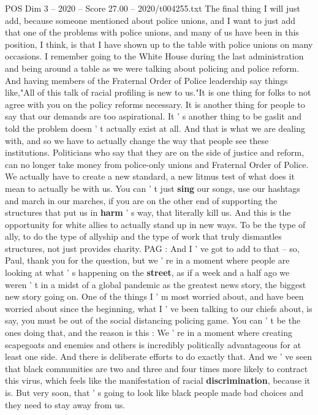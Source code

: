 \begin{textsample}{POS Dim 3 – 2020 – Score 27.00 – 2020/t004255.txt}
The final thing I will just add, because someone mentioned about police unions, and I want to just add that one of the problems with police unions, and many of us have been in this position, I think, is that I have shown up to the table with police unions on many occasions.
I remember going to the White House during the last administration and being around a table as we were talking about policing and police reform.
And having members of the Fraternal Order of Police leadership say things like,"All of this talk of racial profiling is new to us."It is one thing for folks to not agree with you on the policy reforms necessary.
It is another thing for people to say that our demands are too aspirational.
It ' s another thing to be gaslit and told the problem doesn ' t actually exist at all.
And that is what we are dealing with, and so we have to actually change the way that people see these institutions.
Politicians who say that they are on the side of justice and reform, can no longer take money from police-only unions and Fraternal Order of Police.
We actually have to create a new standard, a new litmus test of what does it mean to actually be with us.
You can ' t just \textbf{sing} our songs, use our hashtags and march in our marches, if you are on the other end of supporting the structures that put us in \textbf{harm} ' s way, that literally kill us.
And this is the opportunity for white allies to actually stand up in new ways.
To be the type of ally, to do the type of allyship and the type of work that truly dismantles structures, not just provides charity.
PAG : And I ' ve got to add to that -- so, Paul, thank you for the question, but we ' re in a moment where people are looking at what ' s happening on the \textbf{street}, as if a week and a half ago we weren ' t in a midst of a global pandemic as the greatest news story, the biggest new story going on.
One of the things I ' m most worried about, and have been worried about since the beginning, what I ' ve been talking to our chiefs about, is say, you must be out of the social distancing policing game.
You can ' t be the ones doing that, and the reason is this : We ' re in a moment where creating scapegoats and enemies and others is incredibly politically advantageous for at least one side.
And there is deliberate efforts to do exactly that.
And we ' ve seen that black communities are two and three and four times more likely to contract this virus, which feels like the manifestation of racial \textbf{discrimination}, because it is.
But very soon, that ' s going to look like black people made bad choices and they need to stay away from us.

\end{textsample}
